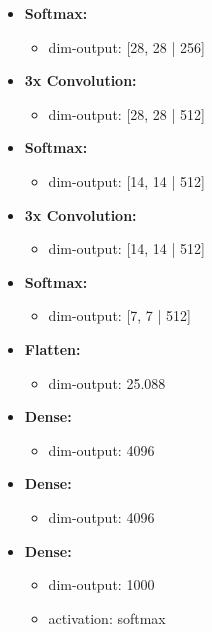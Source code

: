 \begin{itemize}
\begin{itemize}
			\item[]\textbf{Softmax:} 
			\begin{itemize}
				\item[] dim-output: [28, 28 | 256]				
			\end{itemize}
			
			\item[]\textbf{3x Convolution:} 
			\begin{itemize}
				\item[] dim-output: [28, 28 | 512]
			\end{itemize}
			
			\item[]\textbf{Softmax:} 
			\begin{itemize}
				\item[] dim-output: [14, 14 | 512]				
			\end{itemize}
			
			\item[]\textbf{3x Convolution:} 
			\begin{itemize}
				\item[] dim-output: [14, 14 | 512]
			\end{itemize}
			
			\item[]\textbf{Softmax:} 
			\begin{itemize}
				\item[] dim-output: [7, 7 | 512]				
			\end{itemize}
			
			\item[]\textbf{Flatten:} 
			\begin{itemize}
				\item[] dim-output: 25.088				
			\end{itemize}
			
			\item[]\textbf{Dense:} 
			\begin{itemize}
				\item[] dim-output: 4096
			\end{itemize}
			
			\item[]\textbf{Dense:} 
			\begin{itemize}
				\item[] dim-output: 4096
			\end{itemize}
			
			\item[]\textbf{Dense:} 
			\begin{itemize}
				\item[] dim-output: 1000
				\item[] activation: softmax
			\end{itemize}
			
	\end{itemize}
\end{itemize}

